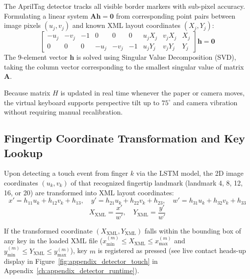 The AprilTag detector tracks all visible border markers with sub-pixel accuracy. Formulating a linear system $\mathbf{A} \mathbf{h} = \mathbf{0}$ from corresponding point pairs between image pixels $(u_j, v_j)$ and known XML layout coordinates $(X_j, Y_j)$:
\begin{equation}
\begin{bmatrix}
-u_j & -v_j & -1 & 0 & 0 & 0 & u_j X_j & v_j X_j & X_j \\
0 & 0 & 0 & -u_j & -v_j & -1 & u_j Y_j & v_j Y_j & Y_j
\end{bmatrix} \mathbf{h} = \mathbf{0}
\label{eq:meth_dlt_matrix}
\end{equation}
The 9-element vector $\mathbf{h}$ is solved using Singular Value Decomposition (SVD), taking the column vector corresponding to the smallest singular value of matrix $\mathbf{A}$.

Because matrix $H$ is updated in real time whenever the paper or camera moves, the virtual keyboard supports perspective tilt up to $75^\circ$ and camera vibration without requiring manual recalibration.

\subsection{Fingertip Coordinate Transformation and Key Lookup}
\label{subsec:meth_coord_transform}
Upon detecting a touch event from finger $k$ via the LSTM model, the 2D image coordinates $(u_k, v_k)$ of that recognized fingertip landmark (landmark 4, 8, 12, 16, or 20) are transformed into XML layout coordinates:
\begin{equation}
x' = h_{11} u_k + h_{12} v_k + h_{13}, \quad y' = h_{21} u_k + h_{22} v_k + h_{23}, \quad w' = h_{31} u_k + h_{32} v_k + h_{33}
\label{eq:meth_proj_steps}
\end{equation}
\begin{equation}
X_{\text{XML}} = \frac{x'}{w'}, \quad Y_{\text{XML}} = \frac{y'}{w'}
\label{eq:meth_xml_coords}
\end{equation}

If the transformed coordinate $(X_{\text{XML}}, Y_{\text{XML}})$ falls within the bounding box of any key in the loaded XML file ($x_{\min}^{(m)} \le X_{\text{XML}} \le x_{\max}^{(m)}$ and $y_{\min}^{(m)} \le Y_{\text{XML}} \le y_{\max}^{(m)}$), key $m$ is registered as pressed (see live contact heads-up display in Figure~\ref{fig:appendix_detector_touch} in Appendix~\ref{ch:appendix_detector_runtime}).

